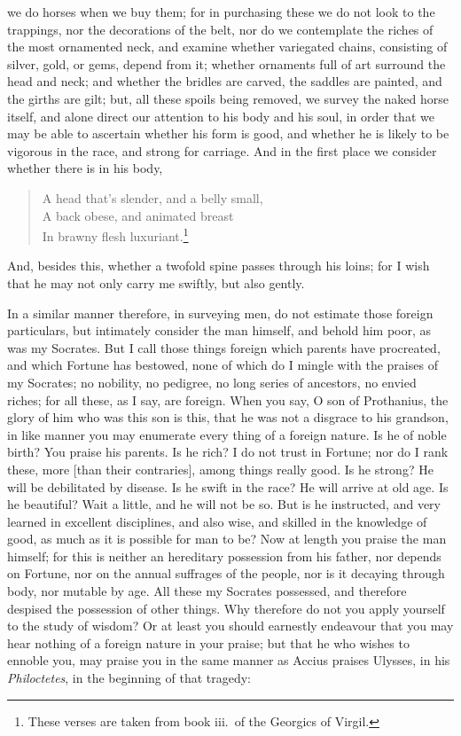 \documentclass{article}
\begin{document}
we do horses when we buy them; for in purchasing these we do not look to the
trappings, nor the decorations of the belt, nor do we contemplate the riches of
the most ornamented neck, and examine whether variegated chains, consisting of
silver, gold, or gems, depend from it; whether ornaments full of art surround
the head and neck; and whether the bridles are carved, the saddles are painted,
and the girths are gilt; but, all these spoils being removed, we survey the
naked horse itself, and alone direct our attention to his body and his soul, in
order that we may be able to ascertain whether his form is good, and whether he
is likely to be vigorous in the race, and strong for carriage. And in the first
place we consider whether there is in his body,

\begin{verse}
A head that's slender, and a belly small,\\
A back obese, and animated breast\\
In brawny flesh luxuriant.\footnote{These verses are taken from book iii.~of
the Georgics of Virgil.}
\end{verse}

\noindent And, besides this, whether a twofold spine passes through his loins;
for I wish that he may not only carry me swiftly, but also gently.

In a similar manner therefore, in surveying men, do not estimate those foreign
particulars, but intimately consider the man himself, and behold him poor, as
was my Socrates. But I call those things foreign which parents have procreated,
and which Fortune has bestowed, none of which do I mingle with the praises of
my Socrates; no nobility, no pedigree, no long series of ancestors, no envied
riches; for all these, as I say, are foreign. When you say, O son of
Prothanius, the glory of him who was this son is this, that he was not a
disgrace to his grandson, in like manner you may enumerate every thing of a
foreign nature. Is he of noble birth? You praise his parents. Is he rich? I do
not trust in Fortune; nor do I rank these, more [than their contraries], among
things really good. Is he strong? He will be debilitated by disease. Is he
swift in the race? He will arrive at old age. Is he beautiful? Wait a little,
and he will not be so. But is he instructed, and very learned in excellent
disciplines, and also wise, and skilled in the knowledge of good, as much as it
is possible for man to be? Now at length you praise the man himself; for this
is neither an hereditary possession from his father, nor depends on Fortune,
nor on the annual suffrages of the people, nor is it decaying through body, nor
mutable by age. All these my Socrates possessed, and therefore despised the
possession of other things. Why therefore do not you apply yourself to the
study of wisdom? Or at least you should earnestly endeavour that you may hear
nothing of a foreign nature in your praise; but that he who wishes to ennoble
you, may praise you in the same manner as Accius praises Ulysses, in his
\textit{Philoctetes}, in the beginning of that tragedy:
\end{document}
